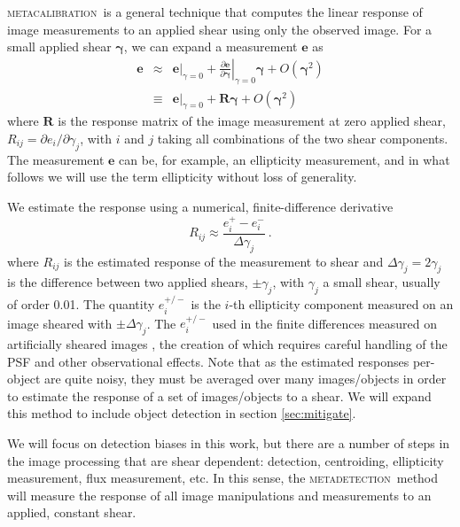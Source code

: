 \documentclass[iop, twocolappendix, appendixfloats, numberedappendix, apj]{hackemulateapj}
\newcommand{\mcal}{\textsc{metacalibration}}
\newcommand{\mdet}{\textsc{metadetection}}
\begin{document}
\mcal\ is a general technique that computes the linear response of image
measurements to an applied shear using only the observed image.  For a small
applied shear $\boldsymbol{\gamma}$, we can expand a measurement $\boldsymbol{e}$ as
\begin{eqnarray}
\boldsymbol{e} & \approx & \left.\boldsymbol{e}\right|_{\gamma=0} +
                           \left.\frac{\partial \boldsymbol{e}}{\partial\boldsymbol\gamma}\right|_{\gamma=0} \boldsymbol\gamma +
                           O(\boldsymbol\gamma^2)\nonumber\\
               & \equiv  & \left.\boldsymbol{e}\right|_{\gamma=0} +
                           \boldsymbol{R} \boldsymbol\gamma +
                           O(\boldsymbol\gamma^2)
\end{eqnarray}
where $\boldsymbol{R}$ is the response matrix of the image measurement
at zero applied shear, $R_{ij}=\partial e_i /\partial \gamma_j$, with $i$ and
$j$ taking all combinations of the two shear components.  The measurement
$\boldsymbol{e}$ can be, for example,  an ellipticity measurement, and in what
follows we will use the term ellipticity without loss of generality.

We estimate the response using a numerical, finite-difference derivative
\begin{equation}
R_{ij} \approx \frac{e_i^{+} - e_i^{-}}{\Delta\gamma_j}\ .
\end{equation}
where $R_{ij}$ is the estimated response of the measurement to shear and
$\Delta\gamma_j = 2 \gamma_j$ is the difference between two applied shears,
$\pm \gamma_j$, with $\gamma_j$ a small shear, usually of order 0.01. The
quantity $e_i^{+/-}$ is the $i$-th ellipticity component measured on an image
sheared with $\pm\Delta\gamma_j$.  The $e_i^{+/-}$ used in the finite
differences measured on artificially sheared images \citep{SheldonMcal2017},
the creation of which requires careful handling of the PSF and other
observational effects.  Note that as the estimated responses per-object are
quite noisy, they must be averaged over many images/objects in order to
estimate the response of a set of images/objects to a shear.
We will expand this method to include object detection in section
\ref{sec:mitigate}.

We will focus on detection biases in this work, but there are a number of steps
in the image processing that are shear dependent: detection, centroiding,
ellipticity measurement, flux measurement, etc.  In this sense, the \mdet\
method will measure the response of all image manipulations and measurements to
an applied, constant shear.
\end{document}
